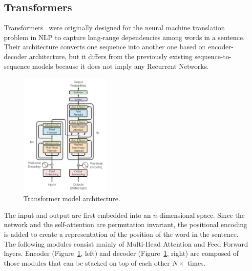\subsection{Transformers}
\label{trans}
Transformers~\cite{vaswani2017attention} were originally designed for the neural machine translation problem in NLP to capture long-range dependencies among words in a sentence.
Their architecture converts one sequence into another one based on encoder-decoder architecture,
but it differs from the previously existing sequence-to-sequence models because
it does not imply any Recurrent Networks. 
\begin{figure}
  \centering
  \includegraphics[width=0.4\textwidth]{figures/03_transformer_overview.png}
  \caption{Transformer model architecture. \cite{vaswani2017attention}}
  \label{fig:trans_arch}
\end{figure}
The input and output are first embedded into an $n$-dimensional space.
Since the network and the self-attention are permutation invariant,
the positional encoding is added to create a representation of the position of the word in the sentence.
The following modules consist mainly of Multi-Head Attention and Feed Forward layers. 
Encoder (Figure~\ref{fig:trans_arch}, left) and decoder (Figure~\ref{fig:trans_arch}, right)
are composed of those modules that can be stacked on top of each other $N\times$ times.

